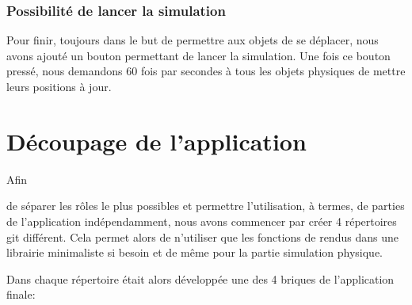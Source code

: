 \documentclass[11pt]{report}
\begin{document}

\subsection{Possibilité de lancer la simulation}

Pour finir, toujours dans le but de permettre aux objets de se déplacer, nous avons ajouté un bouton permettant de lancer la simulation.
Une fois ce bouton pressé, nous demandons 60 fois par secondes à tous les objets physiques de mettre leurs positions à jour.


\chapter{Découpage de l'application}

\hypertarget{découpage}{Afin} de séparer les rôles le plus possibles et permettre l'utilisation, à termes, de parties de l'application
indépendamment, nous avons commencer par créer 4 répertoires git différent. Cela permet alors de n'utiliser que
les fonctions de rendus dans une librairie minimaliste si besoin et de même pour la partie simulation physique.\newline

Dans chaque répertoire était alors développée une des 4 briques de l'application finale:\newline
\end{document}
